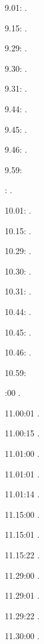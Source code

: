 \documentclass[italian]{article}
\begin{document}
9.01:   . 

9.15:   . 

9.29:   . 

9.30:   .

9.31:   .

9.44:   .

9.45:   .

9.46:   .

9.59:   

:  .

10.01:   . 

10.15:   . 

10.29:   . 

10.30:   .

10.31:   .

10.44:   .

10.45:   .

10.46:   .

10.59:   

:00  .

11.00:01  .

11.00:15  .

11.01:00   . 

11.01:01   . 

11.01:14   . 

11.15:00   . 

11.15:01   . 

11.15:22   . 

11.29:00   . 

11.29:01   . 

11.29:22   . 

11.30:00   .
\end{document}

